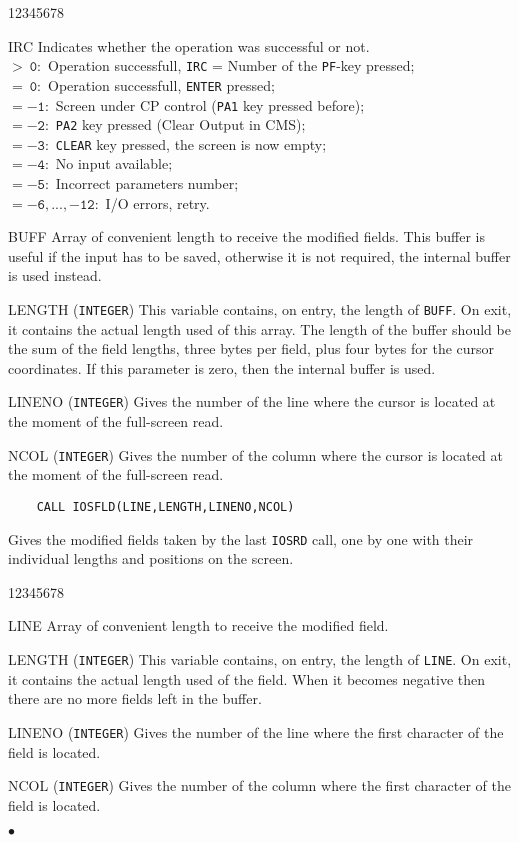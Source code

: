 \begin{DLtt}{12345678}
\item[IRC] Indicates whether the operation was successful or not. \\
$\mathtt{> \ 0:}$ Operation successfull, {\tt IRC} = Number of
the {\tt PF}-key pressed; \\
$\mathtt{= \ 0:}$ Operation successfull, {\tt ENTER} pressed; \\
$\mathtt{= -1:}$ Screen under CP control ({\tt PA1} key pressed before); \\
$\mathtt{= -2:}$ {\tt PA2} key pressed (Clear Output in CMS); \\
$\mathtt{= -3:}$ {\tt CLEAR} key pressed, the screen is now empty; \\
$\mathtt{= -4:}$ No input available; \\
$\mathtt{= -5:}$ Incorrect parameters number; \\
$\mathtt{= -6,...,-12:}$ I/O errors, retry.
\item [BUFF] Array of convenient length to receive the modified fields.
This buffer is useful if the input has to be saved, otherwise it
is not required, the internal buffer is used instead.
\item [LENGTH] ({\tt INTEGER}) This variable contains, on entry,
the length of {\tt BUFF}. On exit, it contains the actual length used of
this array.
The length of the buffer should be the sum of the field lengths,
three bytes per field, plus four bytes for the cursor coordinates.
If this parameter is zero, then the internal buffer is used.
\item [LINENO] ({\tt INTEGER}) Gives the number of the line where
the cursor is located at the moment of the full-screen read.
\item [NCOL] ({\tt INTEGER}) Gives the number of the column where
the cursor is located at the moment of the full-screen read.
\end{DLtt}
\begin{verbatim}
    CALL IOSFLD(LINE,LENGTH,LINENO,NCOL)
\end{verbatim}
Gives the modified fields taken by the last {\tt IOSRD} call, one by one
with their individual lengths and positions on the screen.
\begin{DLtt}{12345678}
\item [LINE] Array of convenient length to receive the modified field.
\item [LENGTH] ({\tt INTEGER}) This variable contains, on entry,
the length of {\tt LINE}. On exit, it contains the actual length used of
the field. When it becomes negative then there are no more fields left
in the buffer.
\item [LINENO] ({\tt INTEGER}) Gives the number of the line where
the first character of the field is located.
\item [NCOL] ({\tt INTEGER}) Gives the number of the column
where the first character of the field is located.
\end{DLtt}
$\bullet$
